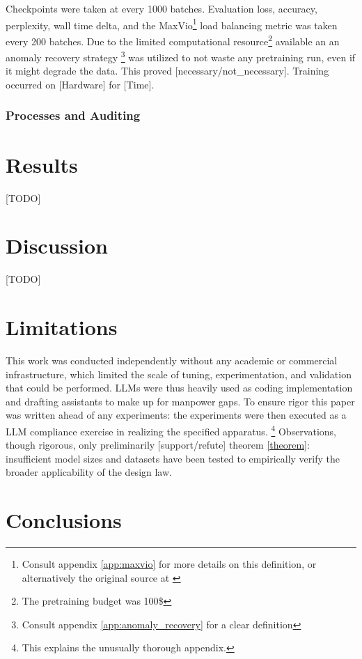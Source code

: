 \documentclass[11pt]{article}
\begin{document}
Checkpoints were taken at every 1000 batches. Evaluation loss, accuracy, perplexity, wall time delta, and the MaxVio\footnote{Consult appendix \ref{app:maxvio} for more details on this definition, or alternatively the original source at \citet{wang2024auxiliarylossfree}} load balancing metric was taken every 200 batches. Due to the limited computational resource\footnote{The pretraining budget was 100\$} available an an anomaly recovery strategy \footnote{Consult appendix \ref{app:anomaly_recovery} for a clear definition} was utilized to not waste any pretraining run, even if it might degrade the data. This proved [necessary/not\_necessary]. Training occurred on [Hardware] for [Time].

\subsubsection{Processes and Auditing}


\section{Results}
\label{sec:results}

[TODO]

\section{Discussion}
\label{sec:discussion}

[TODO]

\section{Limitations}

This work was conducted independently without any academic or commercial infrastructure, which limited the scale of tuning, experimentation, and validation that could be performed. LLMs were thus heavily used as coding implementation and drafting assistants to make up for manpower gaps. To ensure rigor this paper was written ahead of any experiments: the experiments were then executed as a LLM compliance exercise in realizing the specified apparatus. \footnote{This explains the unusually thorough appendix.} Observations, though rigorous, only preliminarily [support/refute] theorem \ref{theorem}: insufficient model sizes and datasets have been tested to empirically verify the broader applicability of the design law.

\section{Conclusions}
\end{document}
